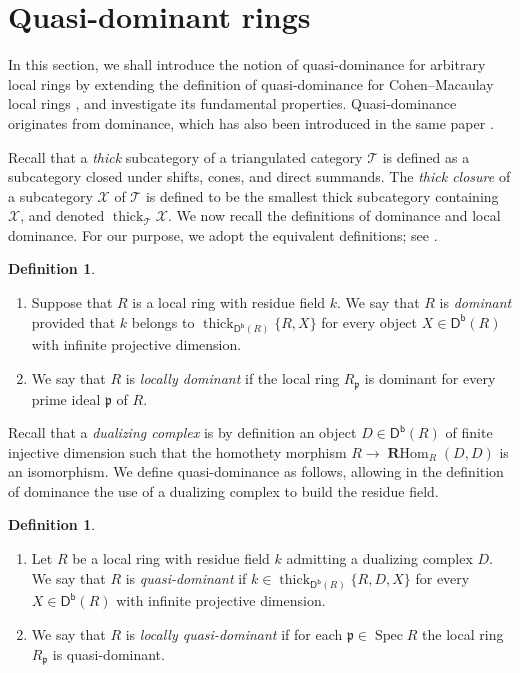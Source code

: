 \documentclass{amsart}
\theoremstyle{definition}
\newtheorem{dfn}[thm]{Definition}
\theoremstyle{remark}
\numberwithin{equation}{thm}
\def\Db{\operatorname{\mathsf{D^b}}}
\def\p{\mathfrak{p}}
\def\RHom{\operatorname{\mathbf{R}Hom}}
\def\spec{\operatorname{Spec}}
\def\T{\mathcal{T}}
\def\thick{\operatorname{thick}}
\def\X{\mathcal{X}}
\begin{document}
\section{Quasi-dominant rings}

In this section, we shall introduce the notion of quasi-dominance for arbitrary local rings by extending the definition of quasi-dominance for Cohen--Macaulay local rings \cite{T23}, and investigate its fundamental properties.
Quasi-dominance originates from dominance, which has also been introduced in the same paper \cite{T23}.

Recall that a {\em thick} subcategory of a triangulated category $\T$ is defined as a subcategory closed under shifts, cones, and direct summands.
The \textit{thick closure} of a subcategory $\X$ of $\T$ is defined to be the smallest thick subcategory containing $\X$, and denoted $\thick_\T \X$.
We now recall the definitions of dominance and local dominance.
For our purpose, we adopt the equivalent definitions; see \cite[Corollary 10.8 and Remark 10.9]{T23}.

\begin{dfn}
\begin{enumerate}[(1)]
\item
Suppose that $R$ is a local ring with residue field $k$.
We say that $R$ is \textit{dominant} provided that $k$ belongs to $\thick_{\Db(R)}\{R, X\}$ for every object $X\in\Db(R)$ with infinite projective dimension.
\item
We say that $R$ is \textit{locally dominant} if the local ring $R_\p$ is dominant for every prime ideal $\p$ of $R$.
\end{enumerate}
\end{dfn}

Recall that a \textit{dualizing complex} is by definition an object $D\in\Db(R)$ of finite injective dimension such that the homothety morphism $R\to\RHom_R(D,D)$ is an isomorphism.
We define quasi-dominance as follows, allowing in the definition of dominance the use of a dualizing complex to build the residue field.

\begin{dfn}\label{def_quasidom}
\begin{enumerate}[(1)]
\item
Let $R$ be a local ring with residue field $k$ admitting a dualizing complex $D$.
We say that $R$ is {\em quasi-dominant} if $k\in\thick_{\Db(R)}\{R,D,X\}$ for every $X\in\Db(R)$ with infinite projective dimension.
\item
We say that $R$ is {\em locally quasi-dominant} if for each $\p\in\spec R$ the local ring $R_\p$ is quasi-dominant.
\end{enumerate}
\end{dfn}
\end{document}
